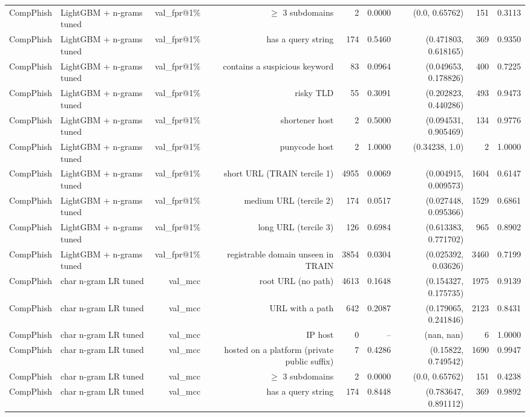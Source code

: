 \begin{table}[t]
\begin{tabular}{llrrrrrrr}
CompPhish & LightGBM + n-grams tuned & val\_fpr@1\% & $\geq$ 3 subdomains & 2 & 0.0000 & (0.0, 0.65762) & 151 & 0.3113 \\
CompPhish & LightGBM + n-grams tuned & val\_fpr@1\% & has a query string & 174 & 0.5460 & (0.471803, 0.618165) & 369 & 0.9350 \\
CompPhish & LightGBM + n-grams tuned & val\_fpr@1\% & contains a suspicious keyword & 83 & 0.0964 & (0.049653, 0.178826) & 400 & 0.7225 \\
CompPhish & LightGBM + n-grams tuned & val\_fpr@1\% & risky TLD & 55 & 0.3091 & (0.202823, 0.440286) & 493 & 0.9473 \\
CompPhish & LightGBM + n-grams tuned & val\_fpr@1\% & shortener host & 2 & 0.5000 & (0.094531, 0.905469) & 134 & 0.9776 \\
CompPhish & LightGBM + n-grams tuned & val\_fpr@1\% & punycode host & 2 & 1.0000 & (0.34238, 1.0) & 2 & 1.0000 \\
CompPhish & LightGBM + n-grams tuned & val\_fpr@1\% & short URL (TRAIN tercile 1) & 4955 & 0.0069 & (0.004915, 0.009573) & 1604 & 0.6147 \\
CompPhish & LightGBM + n-grams tuned & val\_fpr@1\% & medium URL (tercile 2) & 174 & 0.0517 & (0.027448, 0.095366) & 1529 & 0.6861 \\
CompPhish & LightGBM + n-grams tuned & val\_fpr@1\% & long URL (tercile 3) & 126 & 0.6984 & (0.613383, 0.771702) & 965 & 0.8902 \\
CompPhish & LightGBM + n-grams tuned & val\_fpr@1\% & registrable domain unseen in TRAIN & 3854 & 0.0304 & (0.025392, 0.03626) & 3460 & 0.7199 \\
CompPhish & char n-gram LR tuned & val\_mcc & root URL (no path) & 4613 & 0.1648 & (0.154327, 0.175735) & 1975 & 0.9139 \\
CompPhish & char n-gram LR tuned & val\_mcc & URL with a path & 642 & 0.2087 & (0.179065, 0.241846) & 2123 & 0.8431 \\
CompPhish & char n-gram LR tuned & val\_mcc & IP host & 0 & -- & (nan, nan) & 6 & 1.0000 \\
CompPhish & char n-gram LR tuned & val\_mcc & hosted on a platform (private public suffix) & 7 & 0.4286 & (0.15822, 0.749542) & 1690 & 0.9947 \\
CompPhish & char n-gram LR tuned & val\_mcc & $\geq$ 3 subdomains & 2 & 0.0000 & (0.0, 0.65762) & 151 & 0.4238 \\
CompPhish & char n-gram LR tuned & val\_mcc & has a query string & 174 & 0.8448 & (0.783647, 0.891112) & 369 & 0.9892 \\

\end{tabular}
\end{table}
